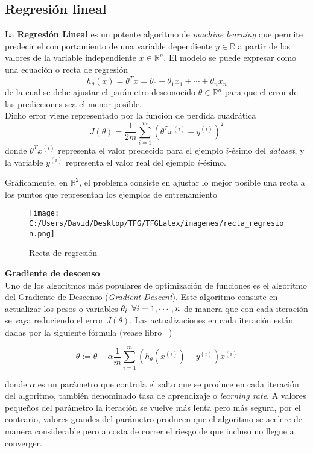 \subsection{Regresión lineal}
La \textbf{Regresión Lineal} es un potente algoritmo de \textit{machine learning} que 
permite predecir el comportamiento de una variable dependiente $y \in \mathds{R}$ a partir de los 
valores de la variable independiente $x \in \mathds{R}^n$.
El modelo se puede expresar como una ecuación o recta de regresión 
$$h_{\theta}(x) = \theta^T x = \theta_0 + \theta_1 x_1 + \cdots + \theta_n x_n$$
de la cual se debe ajustar el parámetro desconocido $\theta \in \mathds{R}^n$ para que el error 
de las predicciones sea el menor posible.\\
Dicho error viene representado por la función de perdida cuadrática
$$J(\theta) = \frac{1}{2m} \sum_{i=1}^{m}(\theta^Tx^{(i)} - y^{(i)})^2$$
donde $\theta^Tx^{(i)}$ representa el valor predecido para el ejemplo $i$-ésimo del \textit{dataset}, y la variable 
$y^{(i)}$ representa el valor real del ejemplo $i$-ésimo.

Gráficamente, en $\mathds{R}^2$, el problema consiste en ajustar lo mejor posible una recta a los 
puntos que representan los ejemplos de entrenamiento

\begin{figure}[h]
  \centering
  \texttt{[image: C:/Users/David/Desktop/TFG/TFGLatex/imagenes/recta\_regresion.png]}
  \caption[Regresión lineal en $\mathds{R}^2$]{Recta de regresión}
  \label{recta_regresion}
\end{figure}

\noindent \textbf{Gradiente de descenso}\\
Uno de los algoritmos más populares de optimización de funciones es el algoritmo del Gradiente 
de Descenso 
(\href{https://en.wikipedia.org/wiki/Gradient_descent}{\textit{Gradient Descent}}).
Este algoritmo consiste en actualizar los pesos o variables $\theta_i \enskip \forall i=1, \cdots, n$ de 
manera que con cada iteración se vaya reduciendo el error $J(\theta)$.
Las actualizaciones en cada iteración están dadas por la siguiente fórmula (vease libro ~\cite{DBLP:books/lib/Bishop07})

\begin{equation}
\theta := \theta - \alpha \frac{1}{m} \sum_{i=1}^{m}(h_{\theta}(x^{(i)}) - y^{(i)})x^{(i)}
\end{equation}

\noindent donde $\alpha$ es un parámetro que controla el salto que se produce en cada iteración del algoritmo, 
también denominado tasa de aprendizaje o \textit{learning rate}.
A valores pequeños del parámetro la iteración se vuelve más lenta pero más segura, por el contrario, 
valores grandes del parámetro producen que el algoritmo se acelere de manera considerable pero a costa 
de correr el riesgo de que incluso no llegue a converger.

